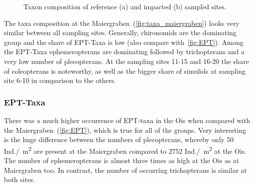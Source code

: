 \begin{figure}[!htb]                                    %
\centering                                                                  %
  \hfill                                                                                    %
  \hspace*{\fill}                                                                           %
\caption{Taxon composition of reference (a) and impacted (b) sampled sites.}\label{fig:taxa_composition}          %
\end{figure}

The taxa composition at the Maiergraben~(\cref{fig:taxa_maiergraben}) looks very similar between all sampling sites. Generally, chironomids are the dominating group and the share of EPT-Taxa is low (also compare with~\cref{fig:EPT}). Among the EPT-Taxa ephemeropterans are dominating followed by trichopterans and a very low number of plecopterans. At the sampling sites 11-15 and 16-20 the share of coleopterans is noteworthy, as well as the bigger share of simulids at sampling site 6-10 in comparison to the others.






\subsubsection{EPT-Taxa}\label{sec:ept_taxa_results}  %

There was a much higher occurrence of EPT-taxa in the Ois when compared with the Maiergraben~(\cref{fig:EPT}), which is true for all of the groups. Very interesting is the huge difference between the numbers of plecopterans, whereby only 50 Ind./\SI{}{\square\meter} are present at the Maiergraben compared to 2752 Ind./\SI{}{\square\meter} at the Ois. The number of ephemeropterans is almost three times as high at the Ois as at Maiergraben too. In contrast, the number of occurring trichopterans is similar at both sites.



